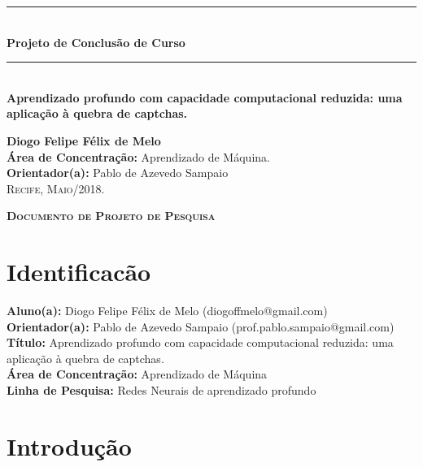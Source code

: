 \documentclass[openany, a4paper,12pt, oneside]{article}
\begin{document}
\pagestyle{empty}
\begin{flushright}
	\noindent\rule{15cm}{0.4pt}\\[0.5cm]
	\textbf{{ \LARGE Projeto de Conclusão de Curso}}\\[0.1cm]
	\noindent\rule{15cm}{0.4pt}\\[7cm]
	\textbf{{\Large Aprendizado profundo com capacidade computacional reduzida: uma aplicação à quebra de captchas.}}\\[4cm]
\end{flushright}

\begin{center}	
	\textbf{\large Diogo Felipe Félix de Melo}\\[3cm]	
	
	\textbf{\large Área de Concentra\c{c}\~{a}o:} Aprendizado de Máquina.\\	
	\textbf{\large Orientador(a):} Pablo de Azevedo Sampaio\\[2cm]
	\vfill
	\textsc{Recife, Maio/2018}.
\end{center}
\pagebreak
{}

\begin{center}	
	\textbf{\textsc{\large Documento de Projeto de Pesquisa}}\\[1cm]
\end{center}
\section{Identificac\~{a}o}

\textbf{Aluno(a):} Diogo Felipe Félix de Melo (diogoffmelo@gmail.com)\\
\textbf{Orientador(a):} Pablo de Azevedo Sampaio (prof.pablo.sampaio@gmail.com)\\
\textbf{Título:} Aprendizado profundo com capacidade computacional reduzida: uma aplicação à quebra de captchas.\\
\textbf{Área de Concentração:} Aprendizado de Máquina\\
\textbf{Linha de Pesquisa:} Redes Neurais de aprendizado profundo\\


\section{Introdução}
\end{document}
